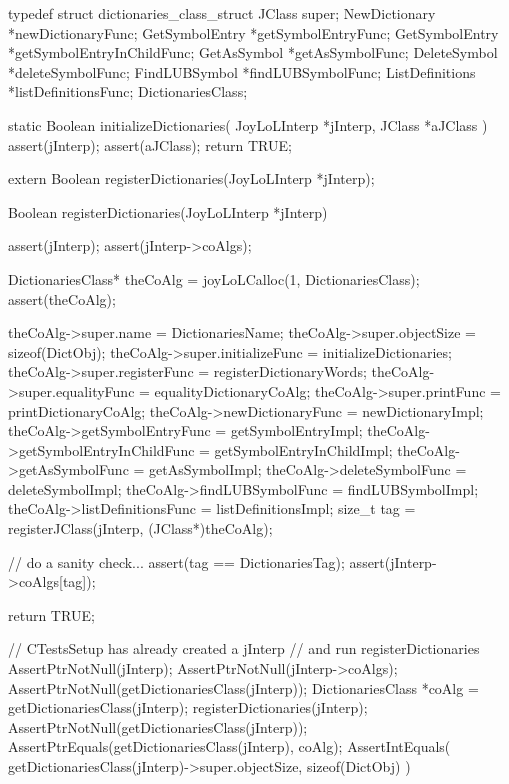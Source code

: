 \startTestSuite[registerDictionaries]

\startCHeader
typedef struct dictionaries_class_struct {
  JClass           super;
  NewDictionary   *newDictionaryFunc;
  GetSymbolEntry  *getSymbolEntryFunc;
  GetSymbolEntry  *getSymbolEntryInChildFunc;
  GetAsSymbol     *getAsSymbolFunc;
  DeleteSymbol    *deleteSymbolFunc;
  FindLUBSymbol   *findLUBSymbolFunc;
  ListDefinitions *listDefinitionsFunc;  
} DictionariesClass;

\stopCHeader

\startCCode
static Boolean initializeDictionaries(
  JoyLoLInterp *jInterp,
  JClass       *aJClass
) {
  assert(jInterp);
  assert(aJClass);
  return TRUE;
}
\stopCCode

\startCHeader
extern Boolean registerDictionaries(JoyLoLInterp *jInterp);
\stopCHeader
{}

\startCCode
Boolean registerDictionaries(JoyLoLInterp *jInterp) {
  assert(jInterp);
  assert(jInterp->coAlgs);
  
  DictionariesClass* theCoAlg
    = joyLoLCalloc(1, DictionariesClass);
  assert(theCoAlg);
  
  theCoAlg->super.name                = DictionariesName;
  theCoAlg->super.objectSize          = sizeof(DictObj);
  theCoAlg->super.initializeFunc      = initializeDictionaries;
  theCoAlg->super.registerFunc        = registerDictionaryWords;
  theCoAlg->super.equalityFunc        = equalityDictionaryCoAlg;
  theCoAlg->super.printFunc           = printDictionaryCoAlg;
  theCoAlg->newDictionaryFunc         = newDictionaryImpl;
  theCoAlg->getSymbolEntryFunc        = getSymbolEntryImpl;
  theCoAlg->getSymbolEntryInChildFunc = getSymbolEntryInChildImpl;
  theCoAlg->getAsSymbolFunc           = getAsSymbolImpl;
  theCoAlg->deleteSymbolFunc          = deleteSymbolImpl;
  theCoAlg->findLUBSymbolFunc         = findLUBSymbolImpl;
  theCoAlg->listDefinitionsFunc       = listDefinitionsImpl;  
  size_t tag =
    registerJClass(jInterp, (JClass*)theCoAlg);
  
  // do a sanity check...
  assert(tag == DictionariesTag);
  assert(jInterp->coAlgs[tag]);
   
  return TRUE;
}
\stopCCode


\startCTest
  // CTestsSetup has already created a jInterp
  // and run registerDictionaries
  AssertPtrNotNull(jInterp);
  AssertPtrNotNull(jInterp->coAlgs);
  AssertPtrNotNull(getDictionariesClass(jInterp));
  DictionariesClass *coAlg = getDictionariesClass(jInterp);
  registerDictionaries(jInterp);
  AssertPtrNotNull(getDictionariesClass(jInterp));
  AssertPtrEquals(getDictionariesClass(jInterp), coAlg);
  AssertIntEquals(
    getDictionariesClass(jInterp)->super.objectSize,
    sizeof(DictObj)
  )
\stopCTest
\stopTestCase
\stopTestSuite
